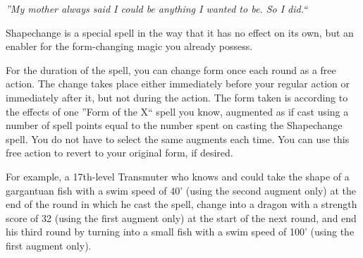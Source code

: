 \emph{''My mother always said I could be anything I wanted to be. So I did.``}

Shapechange is a special spell in the way that it has no effect on its own, but an enabler for the form-changing magic you already possess. 

For the duration of the spell, you can change form once each round as a free action. 
The change takes place either immediately before your regular action or immediately after it, but not during the action.
The form taken is according to the effects of one ''Form of the X`` spell you know, augmented as if cast using a number of spell points equal to the number spent on casting the Shapechange spell.
You do not have to select the same augments each time.
You can use this free action to revert to your original form, if desired.

For example, a 17th-level Transmuter who knows  and  could take the shape of a gargantuan fish with a swim speed of 40' (using the second augment only) at the end of the round in which he cast the spell,
change into a dragon with a strength score of 32 (using the first augment only) at the start of the next round, and end his third round by turning into a small fish with a swim speed of 100' (using the first augment only).

